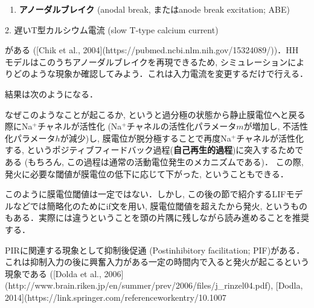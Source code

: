 \begin{enumerate}
\item \textbf{アノーダルブレイク} (anodal break, またはanode break excitation; ABE)
\end{enumerate}
2. 遅いT型カルシウム電流 (slow T-type calcium current)

がある ([Chik et al., 2004](https://pubmed.ncbi.nlm.nih.gov/15324089/))．HH モデルはこのうちアノーダルブレイクを再現できるため, シミュレーションによりどのような現象か確認してみよう．これは入力電流を変更するだけで行える．

結果は次のようになる．


なぜこのようなことが起こるか, というと過分極の状態から静止膜電位へと戻る際にNa$^+$チャネルが活性化 (Na$^+$チャネルの活性化パラメータ$m$が増加し, 不活性化パラメータ$h$が減少)し, 膜電位が脱分極することで再度Na$^+$チャネルが活性化する, というポジティブフィードバック過程(\textbf{自己再生的過程})に突入するためである (もちろん, この過程は通常の活動電位発生のメカニズムである)． この際, 発火に必要な閾値が膜電位の低下に応じて下がった, ということもできる．

このように膜電位閾値は一定ではない．しかし, この後の節で紹介するLIFモデルなどでは簡略化のためにif文を用い, 膜電位閾値を超えたから発火, というものもある．実際には違うということを頭の片隅に残しながら読み進めることを推奨する．

PIRに関連する現象として抑制後促通 (Postinhibitory facilitation; PIF)がある．これは抑制入力の後に興奮入力がある一定の時間内で入ると発火が起こるという現象である ([Dolda et al., 2006](http://www.brain.riken.jp/en/summer/prev/2006/files/j_rinzel04.pdf), [Dodla, 2014](https://link.springer.com/referenceworkentry/10.1007%
